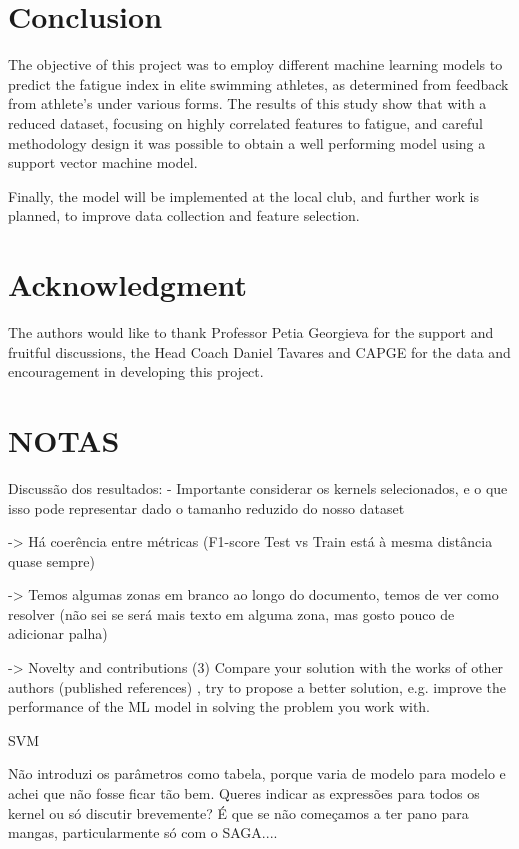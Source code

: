 \documentclass[conference]{IEEEtran}
\begin{document}
\section{Conclusion}

The objective of this project was to employ different machine learning models to predict the fatigue index in elite swimming athletes, as determined from feedback from athlete's under various forms. The results of this study show that with a reduced dataset, focusing on highly correlated features to fatigue, and careful methodology design it was possible to obtain a well performing model using a support vector machine model. 

Finally, the model will be implemented at the local club, and further work is planned, to improve data collection and feature selection.

\section*{Acknowledgment}


The authors would like to thank Professor Petia Georgieva for the support and fruitful discussions, the Head Coach Daniel Tavares and CAPGE for the data and encouragement in developing this project.


\section{NOTAS}

Discussão dos resultados:
-\> Importante considerar os kernels selecionados, e o que isso pode representar dado o tamanho reduzido do nosso dataset

-> Há coerência entre métricas (F1-score Test vs Train está à mesma distância quase sempre)


-> Temos algumas zonas em branco ao longo do documento, temos de ver como resolver (não sei se será mais texto em alguma zona, mas gosto pouco de adicionar palha)


-> Novelty and contributions (3) Compare your solution with the works of other authors (published references) , try to propose a better solution, e.g. improve the performance of the ML model in solving the problem you work with.

SVM

Não introduzi os parâmetros como tabela, porque varia de modelo para modelo e achei que não fosse ficar tão bem. Queres indicar as expressões para todos os kernel ou só discutir brevemente? É que se não começamos a ter pano para mangas, particularmente só com o SAGA....
\end{document}
